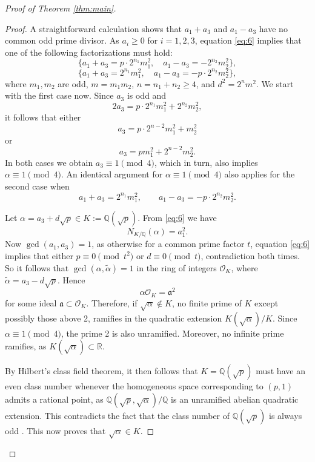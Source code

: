 \documentclass[10pt]{article}
\begin{document}
\begin{proof}[Proof of Theorem \ref{thm:main}]
\begin{proof}
A straightforward calculation shows that \(a_{1} + a_{3}\) and \(a_{1} - a_{3}\) have no common odd prime divisor. As \(a_{i} \geq 0\) for \(i = 1,2,3\), equation \eqref{eq:6} implies that one of the following factorizations must hold:
\[\{a_{1} + a_{3} = p \cdot 2^{n_{1}} m_{1}^{2}, \quad a_{1} - a_{3} = -2^{n_{2}} m_{2}^{2}\},\]
\[\{a_{1} + a_{3} = 2^{n_{1}} m_{1}^{2}, \quad a_{1} - a_{3} = -p \cdot 2^{n_{2}} m_{2}^{2}\},\]
where \(m_{1}, m_{2}\) are odd, \(m = m_{1} m_{2}\), \(n = n_{1} + n_{2} \geq 4\), and \(d^{2} = 2^{n} m^{2}\). We start with the first case now. Since \(a_{3}\) is odd and
\[2a_{3} = p \cdot 2^{n_{1}} m_{1}^{2} + 2^{n_{2}} m_{2}^{2},\]
it follows that either
\[a_{3} = p \cdot 2^{n-2} m_{1}^{2} + m_{2}^{2}\]
or
\[a_{3} = p m_{1}^{2} + 2^{n-2} m_{2}^{2}.\]
In both cases we obtain \(a_{3} \equiv 1 \pmod{4}\), which in turn, also implies \(\alpha \equiv 1 \pmod{4}\). An identical argument for \(\alpha \equiv 1 \pmod{4}\) also applies for the second case when
\[a_{1} + a_{3} = 2^{n_{1}} m_{1}^{2}, \qquad a_{1} - a_{3} = -p \cdot 2^{n_{2}} m_{2}^{2}.\]

Let \(\alpha = a_{3} + d\sqrt{p} \in K := \mathbb{Q}(\sqrt{p})\). From \eqref{eq:6} we have
\[N_{K/\mathbb{Q}}(\alpha) = a_{1}^{2}.\]
Now \(\gcd(a_{1}, a_{3}) = 1\), as otherwise for a common prime factor \(t\), equation \eqref{eq:6} implies that either \(p \equiv 0 \pmod{t^{2}}\) or \(d \equiv 0 \pmod{t}\), contradiction both times. So it follows that \(\gcd(\alpha, \tilde{\alpha}) = 1\) in the ring of integers \(\mathcal{O}_{K}\), where \(\tilde{\alpha} = a_{3} - d\sqrt{p}\). Hence
\[\alpha \mathcal{O}_{K} = \mathfrak{a}^{2}\]
for some ideal \(\mathfrak{a} \subset \mathcal{O}_{K}\). Therefore, if \(\sqrt{\alpha} \notin K\), no finite prime of \(K\) except possibly those above 2, ramifies in the quadratic extension \(K(\sqrt{\alpha})/K\). Since \(\alpha \equiv 1 \pmod{4}\), the prime 2 is also unramified. Moreover, no infinite prime ramifies, as \(K(\sqrt{\alpha}) \subset \mathbb{R}\).

By Hilbert's class field theorem, it then follows that \(K = \mathbb{Q}(\sqrt{p})\) must have an even class number whenever the homogeneous space corresponding to \((p,1)\) admits a rational point, as \(\mathbb{Q}(\sqrt{p}, \sqrt{\alpha})/\mathbb{Q}\) is an unramified abelian quadratic extension. This contradicts the fact that the class number of \(\mathbb{Q}(\sqrt{p})\) is always odd \cite{12}. This now proves that \(\sqrt{\alpha} \in K\).
\end{proof}


\end{proof}
\end{document}
